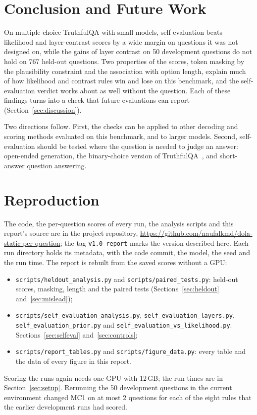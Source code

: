 \documentclass[11pt]{article}
\begin{document}
\section{Conclusion and Future Work}
\label{sec:conclusion}
On multiple-choice TruthfulQA with small models, self-evaluation beats likelihood and layer-contrast scores by a
wide margin on questions it was not designed on, while the gains of layer contrast on 50 development questions do
not hold on 767 held-out questions. Two properties of the scores, token masking by the plausibility constraint and
the association with option length, explain much of how likelihood and contrast rules win and lose on this
benchmark, and the self-evaluation verdict works about as well without the question. Each of these findings turns
into a check that future evaluations can report (Section~\ref{sec:discussion}).

Two directions follow. First, the checks can be applied to other decoding and scoring methods evaluated on this
benchmark, and to larger models. Second, self-evaluation should be tested where the question is needed to judge an
answer: open-ended generation, the binary-choice version of TruthfulQA~\citep{evans2025improved}, and short-answer
question answering.




\appendix
\section{Reproduction}
\label{app:repro}
The code, the per-question scores of every run, the analysis scripts and this report's source are in the
project repository, \url{https://github.com/naufalkmd/dola-static-per-question}; the tag \texttt{v1.0-report} marks
the version described here. Each run directory holds its
metadata, with the code commit, the model, the seed and the run time. The report is rebuilt from the saved scores
without a GPU:
\begin{itemize}\raggedright
\item \texttt{scripts/heldout\_analysis.py} and \texttt{scripts/paired\_tests.py}: held-out scores, masking,
  length and the paired tests (Sections~\ref{sec:heldout} and~\ref{sec:mislead});
\item \texttt{scripts/self\_evaluation\_analysis.py}, \texttt{self\_evaluation\_layers.py},
  \texttt{self\_evaluation\_prior.py} and \texttt{self\_evaluation\_vs\_likelihood.py}: Sections~\ref{sec:selfeval}
  and~\ref{sec:controls};
\item \texttt{scripts/report\_tables.py} and \texttt{scripts/figure\_data.py}: every table and the data of every
  figure in this report.
\end{itemize}
Scoring the runs again needs one GPU with 12\,GB; the run times are in Section~\ref{sec:setup}. Rerunning the 50
development questions in the current environment changed MC1 on at most 2 questions for each of the eight rules
that the earlier development runs had scored.
\end{document}
